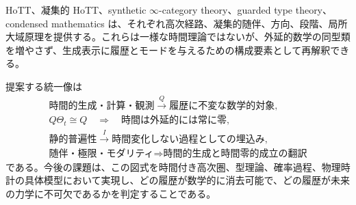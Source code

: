 \documentclass[a4paper,11pt]{ltjsarticle}
\theoremstyle{remark}
\begin{document}
HoTT、凝集的 HoTT、synthetic $\infty$-category theory、guarded type theory、condensed mathematics は、それぞれ高次経路、凝集的随伴、方向、段階、局所大域原理を提供する。これらは一様な時間理論ではないが、外延的数学の同型類を増やさず、生成表示に履歴とモードを与えるための構成要素として再解釈できる。

提案する統一像は
\begin{equation*}
 \boxed{
 \begin{gathered}
 \text{時間的生成・計算・観測}
 \xrightarrow{\ Q\ }
 \text{履歴に不変な数学的対象},\\
 Q\Theta_t\cong Q
 \quad\Longrightarrow\quad
 \text{時間は外延的には常に零},\\
 \text{静的普遍性}
 \xrightarrow{\ I\ }
 \text{時間変化しない過程としての埋込み},\\
 \text{随伴・極限・モダリティ}
 \Longrightarrow
 \text{時間的生成と時間零的成立の翻訳}
 \end{gathered}}
\end{equation*}
である。今後の課題は、この図式を時間付き高次圏、型理論、確率過程、物理時計の具体模型において実現し、どの履歴が数学的に消去可能で、どの履歴が未来の力学に不可欠であるかを判定することである。
\end{document}
